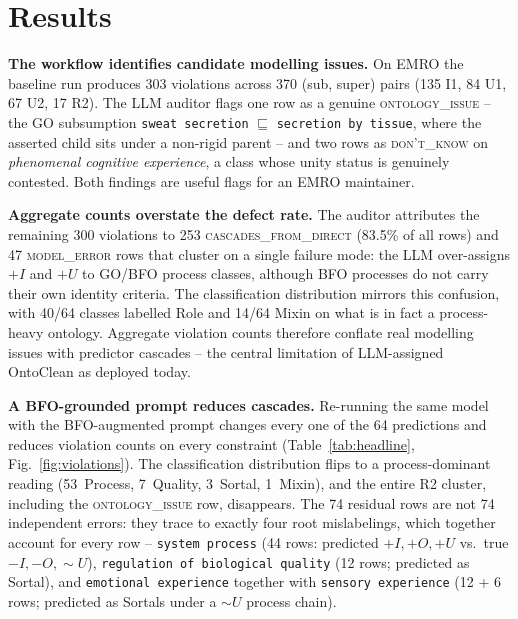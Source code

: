 \documentclass[10pt,a4paper]{article}
\begin{document}
\section{Results}
\textbf{The workflow identifies candidate modelling issues.} On EMRO
the baseline run produces 303 violations across 370 (sub, super) pairs
(135 I1, 84 U1, 67 U2, 17 R2). The LLM auditor flags one row as a
genuine \textsc{ontology\_issue} -- the GO subsumption \texttt{sweat
secretion} $\sqsubseteq$ \texttt{secretion by tissue}, where the
asserted child sits under a non-rigid parent -- and two rows as
\textsc{don't\_know} on \emph{phenomenal cognitive experience}, a
class whose unity status is genuinely contested. Both findings are
useful flags for an EMRO maintainer.

\textbf{Aggregate counts overstate the defect rate.} The auditor
attributes the remaining 300 violations to 253
\textsc{cascades\_from\_direct} (83.5\% of all rows) and 47
\textsc{model\_error} rows that cluster on a single failure mode: the
LLM over-assigns $+I$ and $+U$ to GO/BFO process classes, although BFO
processes do not carry their own identity criteria. The classification
distribution mirrors this confusion, with 40/64 classes labelled Role
and 14/64 Mixin on what is in fact a process-heavy ontology. Aggregate
violation counts therefore conflate real modelling issues with
predictor cascades -- the central limitation of LLM-assigned OntoClean
as deployed today.

\textbf{A BFO-grounded prompt reduces cascades.} Re-running the same
model with the BFO-augmented prompt changes every one of the 64
predictions and reduces violation counts on every constraint
(Table~\ref{tab:headline}, Fig.~\ref{fig:violations}). The
classification distribution flips to a process-dominant reading
(53~Process, 7~Quality, 3~Sortal, 1~Mixin), and the entire R2 cluster,
including the \textsc{ontology\_issue} row, disappears. The 74
residual rows are not 74 independent errors: they trace to exactly
four root mislabelings, which together account for every row --
\texttt{system process} (44 rows: predicted $+I,+O,+U$ vs.\ true
$-I,-O,\sim\!U$), \texttt{regulation of biological quality} (12 rows;
predicted as Sortal), and \texttt{emotional experience} together with
\texttt{sensory experience} (12 + 6 rows; predicted as Sortals under a
$\sim\!U$ process chain).
\end{document}

